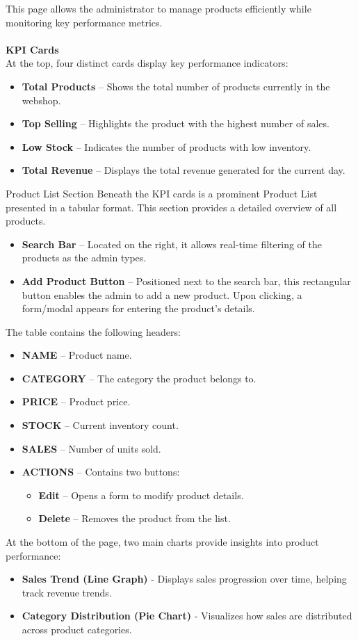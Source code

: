 \documentclass[12pt]{article}
\begin{document}
	This page allows the administrator to manage products efficiently while monitoring key performance metrics. \\ \\
	\textbf{KPI Cards} \\
	At the top, four distinct cards display key performance indicators:
	\begin{itemize}
		\item \textbf{Total Products} – Shows the total number of products currently in the webshop.
		\item \textbf{Top Selling} – Highlights the product with the highest number of sales.
		\item \textbf{Low Stock} – Indicates the number of products with low inventory.
		\item \textbf{Total Revenue} – Displays the total revenue generated for the current day.
	\end{itemize}
	Product List Section
	Beneath the KPI cards is a prominent Product List presented in a tabular format. This section provides a detailed overview of all products.
	\begin{itemize}
		\item \textbf{Search Bar} – Located on the right, it allows real-time filtering of the products as the admin types.
		\item \textbf{Add Product Button} – Positioned next to the search bar, this rectangular button enables the admin to add a new product. Upon clicking, a form/modal appears for entering the product’s details.
	\end{itemize}
	The table contains the following headers:
	\begin{itemize}
		\item \textbf{NAME} – Product name.
		\item \textbf{CATEGORY} – The category the product belongs to.
		\item \textbf{PRICE} – Product price.
		\item \textbf{STOCK} – Current inventory count.
		\item \textbf{SALES} – Number of units sold.
		\item \textbf{ACTIONS} – Contains two buttons:
		\begin{itemize}
			\item \textbf{Edit} – Opens a form to modify product details.
			\item \textbf{Delete} – Removes the product from the list.
		\end{itemize}
	\end{itemize}
	At the bottom of the page, two main charts provide insights into product performance:
	\begin{itemize}
		\item \textbf{Sales Trend (Line Graph)} - Displays sales progression over time, helping track revenue trends.
		\item \textbf{Category Distribution (Pie Chart)} - Visualizes how sales are distributed across product categories.
	\end{itemize}
	
\end{document}

